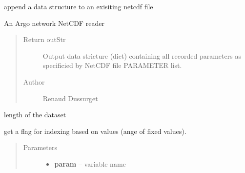 \documentclass[letterpaper,10pt,english]{sphinxmanual}
\begin{document}
\begin{fulllineitems}
\begin{fulllineitems}
\end{fulllineitems}


\begin{fulllineitems}
\label{altimetry.data:altimetry.data.hydro_data.push_nc}
append a data structure to an exisiting netcdf file

\end{fulllineitems}


\begin{fulllineitems}
\label{altimetry.data:altimetry.data.hydro_data.read_ArgoNC}
An Argo network NetCDF reader
\begin{quote}\begin{description}
\item[{Return outStr}] \leavevmode
Output data stricture (dict) containing all recorded parameters as specificied by NetCDF file PARAMETER list.

\item[{Author }] \leavevmode
Renaud Dussurget

\end{description}\end{quote}

\end{fulllineitems}


\begin{fulllineitems}
\label{altimetry.data:altimetry.data.hydro_data.size}
length of the dataset

\end{fulllineitems}


\begin{fulllineitems}
\label{altimetry.data:altimetry.data.hydro_data.slice}
get a flag for indexing based on values (ange of fixed values).
\begin{quote}\begin{description}
\item[{Parameters}] \leavevmode\begin{itemize}
\item {} 
\textbf{param} -- variable name


\end{itemize}
\end{description}
\end{quote}
\end{fulllineitems}
\end{fulllineitems}
\end{document}
